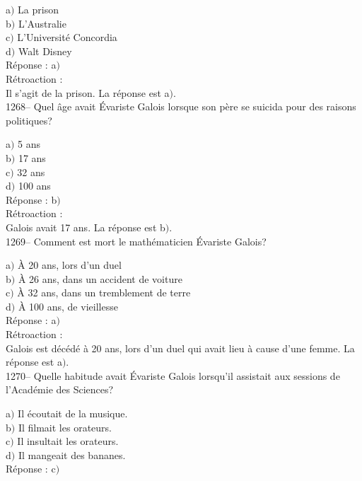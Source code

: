 ﻿\documentclass[letterpaper, 12pt]{article}
\begin{document}
a$)$ La prison \\
b$)$ L'Australie \\
c$)$ L'Universit\'e Concordia \\
d$)$ Walt Disney\\

R\'eponse : a$)$\\

R\'etroaction : \\
Il s'agit de la prison.
La r\'eponse est a$)$.\\

1268-- Quel \^age avait \'Evariste Galois lorsque son p\`ere se
suicida pour des raisons politiques?

a$)$ 5 ans \\
b$)$ 17 ans \\
c$)$ 32 ans \\
d$)$ 100 ans\\

R\'eponse : b$)$\\

R\'etroaction : \\
Galois avait 17 ans.
La r\'eponse est b$)$.\\

1269-- Comment est mort le math\'ematicien \'Evariste Galois?

a$)$ \`A 20 ans, lors d'un duel \\
b$)$ \`A 26 ans, dans un accident de voiture \\
c$)$ \`A 32 ans, dans un tremblement de terre \\
d$)$ \`A 100 ans, de vieillesse\\

R\'eponse : a$)$\\

R\'etroaction : \\
Galois est d\'ec\'ed\'e \`a 20 ans, lors d'un duel
qui avait lieu \`a cause d'une femme.
La r\'eponse est a$)$.\\

1270-- Quelle habitude avait \'Evariste Galois lorsqu'il assistait
aux sessions de l'Acad\'emie des Sciences?

a$)$ Il \'ecoutait de la musique. \\
b$)$ Il filmait les orateurs. \\
c$)$ Il insultait les orateurs. \\
d$)$ Il mangeait des bananes.\\

R\'eponse : c$)$\\
\end{document}
